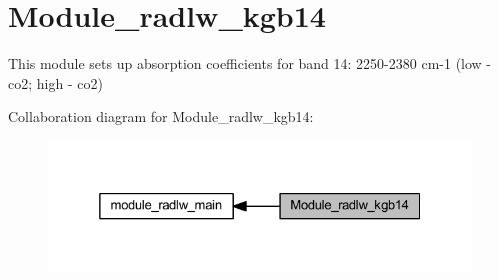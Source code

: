 \hypertarget{group__module__radlw__kgb14}{}\section{Module\+\_\+radlw\+\_\+kgb14}
\label{group__module__radlw__kgb14}


This module sets up absorption coefficients for band 14\+: 2250-\/2380 cm-\/1 (low -\/ co2; high -\/ co2)  


Collaboration diagram for Module\+\_\+radlw\+\_\+kgb14\+:\nopagebreak
\begin{figure}[H]
\begin{center}
\leavevmode
\includegraphics[width=325pt]{group__module__radlw__kgb14}
\end{center}
\end{figure}
